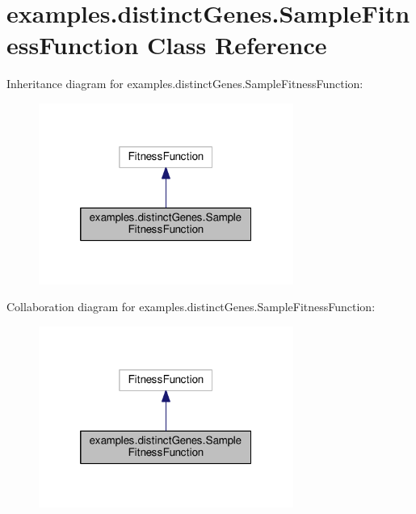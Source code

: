 \hypertarget{classexamples_1_1distinct_genes_1_1_sample_fitness_function}{\section{examples.\-distinct\-Genes.\-Sample\-Fitness\-Function Class Reference}
\label{classexamples_1_1distinct_genes_1_1_sample_fitness_function}
}


Inheritance diagram for examples.\-distinct\-Genes.\-Sample\-Fitness\-Function\-:
\nopagebreak
\begin{figure}[H]
\begin{center}
\leavevmode
\includegraphics[width=236pt]{classexamples_1_1distinct_genes_1_1_sample_fitness_function__inherit__graph}
\end{center}
\end{figure}


Collaboration diagram for examples.\-distinct\-Genes.\-Sample\-Fitness\-Function\-:
\nopagebreak
\begin{figure}[H]
\begin{center}
\leavevmode
\includegraphics[width=236pt]{classexamples_1_1distinct_genes_1_1_sample_fitness_function__coll__graph}
\end{center}
\end{figure}
